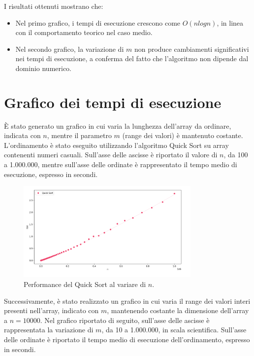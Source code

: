\documentclass[a4paper, 12pt, oneside]{book}
\begin{document}
\noindent I risultati ottenuti mostrano che:

\begin{itemize}
    \item Nel primo grafico, i tempi di esecuzione crescono come \(O(n log n)\), in linea con il comportamento teorico nel caso medio.
    \item Nel secondo grafico, la variazione di \(m\) non produce cambiamenti significativi nei tempi di esecuzione, a conferma del fatto che l'algoritmo non dipende dal dominio numerico.
\end{itemize}

\section{Grafico dei tempi di esecuzione}

È stato generato un grafico in cui varia la lunghezza dell'array da ordinare, indicata con \(n\), mentre il parametro \(m\) (range dei valori) è mantenuto costante. L'ordinamento è stato eseguito utilizzando l'algoritmo Quick Sort su array contenenti numeri casuali. Sull'asse delle ascisse è riportato il valore di \(n\), da 100 a 1.000.000, mentre sull'asse delle ordinate è rappresentato il tempo medio di esecuzione, espresso in secondi.

\begin{figure}[H]
    \centering
    \includegraphics[width=0.8\textwidth]{images/grafico_quick_sort_n.png}
    \caption{Performance del Quick Sort al variare di \(n\).}
    \label{fig:quick_sort_n}
\end{figure}

\noindent Successivamente, è stato realizzato un grafico in cui varia il range dei valori interi presenti nell'array, indicato con \(m\), mantenendo costante la dimensione dell'array a \(n=10000\). Nel grafico riportato di seguito, sull'asse delle ascisse è rappresentata la variazione di \(m\), da 10 a 1.000.000, in scala scientifica. Sull'asse delle ordinate è riportato il tempo medio di esecuzione dell'ordinamento, espresso in secondi.
\end{document}
